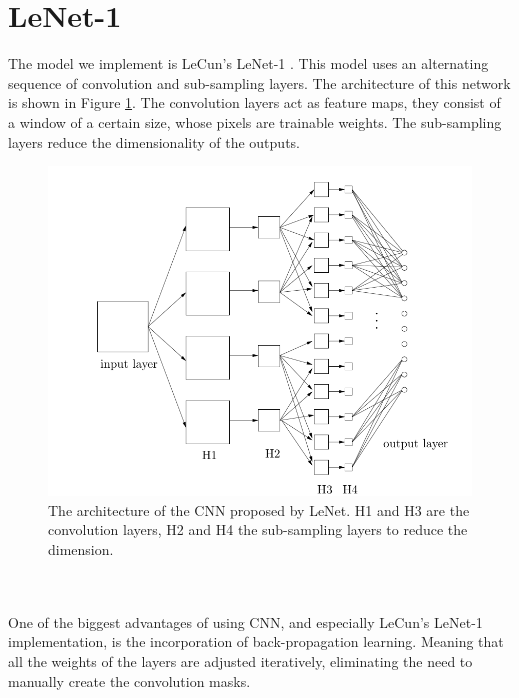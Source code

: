 \documentclass[a4paper,onecolumn]{report}
\begin{document}
\section{LeNet-1}
The model we implement is LeCun's LeNet-1 \cite{lenet}. This model uses an alternating sequence of convolution and sub-sampling layers. The architecture of this network is shown in Figure \ref{fig:Architecture}. The convolution layers act as feature maps, they consist of a window of a certain size, whose pixels are trainable weights. The sub-sampling layers reduce the dimensionality of the outputs. 
\begin{figure}[h!]
    \centering
    \includegraphics[scale=0.4]{./images/Architecture_CNN.png}
    \caption{The architecture of the CNN proposed by LeNet. H1 and H3 are the convolution layers, H2 and H4 the sub-sampling layers to reduce the dimension. }
	\label{fig:Architecture}
\end{figure}
\\\\
One of the biggest advantages of using CNN, and especially LeCun's LeNet-1 implementation, is the incorporation of back-propagation learning. Meaning that all the weights of the layers are adjusted iteratively, eliminating the need to manually create the convolution masks.
\\
\end{document}
